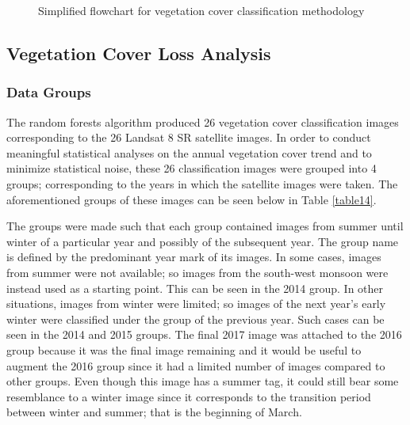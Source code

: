 \begin{figure}[H]
	\vspace{5pt}
	\caption{Simplified flowchart for vegetation cover classification methodology}\label{fig17}
\end{figure}

\subsection{Vegetation Cover Loss Analysis}

\subsubsection{Data Groups}

\justify
The random forests algorithm produced 26 vegetation cover classification images corresponding to the 26 Landsat 8 SR satellite images. In order to conduct meaningful statistical analyses on the annual vegetation cover trend and to minimize statistical noise, these 26 classification images were grouped into 4 groups; corresponding to the years in which the satellite images were taken. The aforementioned groups of these images can be seen below in Table \ref{table14}.

\justify
The groups were made such that each group contained images from summer until winter of a particular year and possibly of the subsequent year. The group name is defined by the predominant year mark of its images. In some cases, images from summer were not available; so images from the south-west monsoon were instead used as a starting point. This can be seen in the 2014 group. In other situations, images from winter were limited; so images of the next year's early winter were classified under the group of the previous year. Such cases can be seen in the 2014 and 2015 groups. The final 2017 image was attached to the 2016 group because it was the final image remaining and it would be useful to augment the 2016 group since it had a limited number of images compared to other groups. Even though this image has a summer tag, it could still bear some resemblance to a winter image since it corresponds to the transition period between winter and summer; that is the beginning of March.

